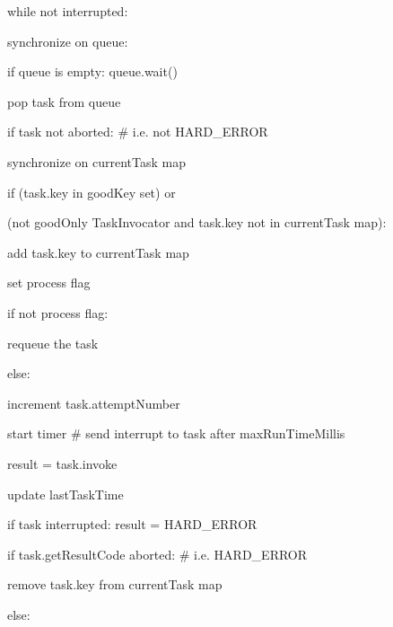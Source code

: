 \begin{code}
  \item while not interrupted:
  \begin{code}
    \item synchronize on queue:
    \begin{code}
      \item if queue is empty: queue.wait()
      \item pop task from queue
    \end{code}
    \item if task not aborted: \# i.e. not HARD\_ERROR
      \begin{code}
      \item synchronize on currentTask map
      \begin{code}
        \item if (task.key in goodKey set) or
        \item (not goodOnly TaskInvocator and task.key not in currentTask map):
        \begin{code}
          \item add task.key to currentTask map
          \item set process flag
        \end{code}
      \end{code}
      \item if not process flag:
      \begin{code}
        \item requeue the task
      \end{code}
      \item else:
      \begin{code}
        \item increment task.attemptNumber      
        \item start timer \# send interrupt to task after maxRunTimeMillis
        \item result = task.invoke
        \item update lastTaskTime
        \item if task interrupted: result = HARD\_ERROR
        \item if task.getResultCode aborted: \# i.e. HARD\_ERROR
        \begin{code}
          \item remove task.key from currentTask map
        \end{code}
        \item else:
        \begin{code}

\end{code}
\end{code}
\end{code}
\end{code}
\end{code}
